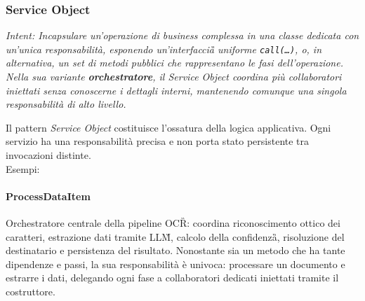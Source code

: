 \documentclass[a4paper,11pt]{article}
\newcommand{\code}[1]{\texttt{#1}}
\newcommand{\pattern}[1]{\textit{#1}}
\begin{document}
\subsubsection{Service Object}

\textit{Intent: Incapsulare un'operazione di business complessa in una classe dedicata con
un'unica responsabilità, esponendo un'interfaccia\G{} uniforme \code{call(\ldots)}, o, in alternativa, un set di metodi pubblici che rappresentano le fasi dell'operazione.
Nella sua variante \textbf{orchestratore}, il Service Object coordina più collaboratori
iniettati senza conoscerne i dettagli interni, mantenendo comunque una singola
responsabilità di alto livello.}

Il pattern \pattern{Service Object} costituisce l'ossatura della logica
applicativa. Ogni servizio ha una responsabilità precisa e non porta stato
persistente tra invocazioni distinte. \\

Esempi:

\paragraph{ProcessDataItem}
Orchestratore centrale della pipeline OCR\G{}: coordina riconoscimento ottico dei
caratteri, estrazione dati tramite LLM\G{}, calcolo della confidenza\G{}, risoluzione
del destinatario e persistenza del risultato.
Nonostante sia un metodo che ha tante dipendenze e passi, la sua responsabilità è univoca: 
processare un documento e estrarre i dati, delegando ogni fase a collaboratori dedicati iniettati 
tramite il costruttore.
\end{document}
